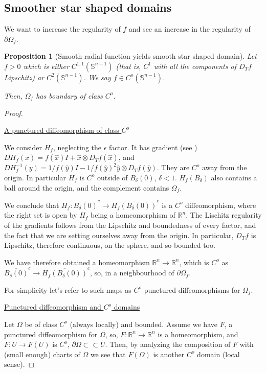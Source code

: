\documentclass[english,a4paper,12pt,oneside]{scrbook}
\theoremstyle{break}
\newtheorem{prop}[equation]{Proposition}
\newenvironment{mproof}[1][\proofname]{%
  \begin{proof}[#1]$ $\par\nobreak\ignorespaces
}{%
  \end{proof}
}
\renewcommand*{\proofname}{Proof}
\theoremstyle{remark}
\newcommand{\mR}{\mathbb{R}}
\newcommand{\mS}{\mathbb{S}^{n-1}}
\newcommand{\cc}{\subset\subset}
\newcommand{\xh}{\hat{x}}
\newcommand{\yh}{\hat{y}}
\newcommand{\eps}{\epsilon}
\begin{document}
\subsection{Smoother star shaped domains}

We want to increase the regularity of $f$ and see an increase in the regularity of $\partial \Omega_f$.

\begin{prop}[Smooth radial function yields smooth star shaped domain]
Let $f>0$ which is either $C^{1,1}(\mS)$ (that is, $C^1$ with all the components of $D_T f$ Lipschitz) ar $C^2(\mS)$. We say $f \in C^o(\mS)$. 

Then, $\Omega_f$ has boundary of class $C^o$.

\end{prop}

\begin{mproof}

\underline{A punctured diffeomorphism of class $C^o$}

We consider $H_f$, neglecting the $\eps$ factor. It has gradient (see \cite{deckelnick}) $D H_f(x) = f(\xh)I+\xh \otimes D_Tf(\xh)$, and  $D H_f^{-1}(y) =1/f(\yh)I-1/f(\yh)^2 \yh \otimes D_Tf(\yh)$. They are $C^o$ away from the origin. In particular $H_f$ is $C^o$  outside of $B_\delta(0)$, $\delta < 1$. $H_f(B_\delta)$ also contains a ball around the origin, and the complement contains $\Omega_f$.

We conclude that $H_f: \overline{B_\delta(0)}^c \rightarrow \overline{H_f(B_\delta(0))}^c$ is a $C^o$ diffeomorphism, where the right set is open by $H_f$ being a homeomorphism of $\mR^n$. The Lischitz regularity of the gradients follows from the Lipschitz and boundedness of every factor, and the fact that we are setting ourselves away from the origin. In particular, $D_T f$ is Lipschitz, therefore continuous, on the sphere, and so bounded too.

We have therefore obtained a homeomorphism $\mR^n \rightarrow \mR^n$, which is $C^o$ as $\overline{B_\delta(0)}^c \rightarrow \overline{H_f(B_\delta(0))}^c$, so, in a neighbourhood of $\partial \Omega_f$.

For simplicity let's refer to such maps as $C^o$ punctured diffeomorphisms for $\Omega_f$.

\underline{Punctured diffeomorphism and $C^o$ domains}

Let $\Omega$ be of class $C^o$ (always locally) and bounded. Assume we have $F$, a punctured diffeomorphism for $\Omega$, so, $F:\mR^n\rightarrow \mR^n$ is a homeomorphism, and $F: U\rightarrow F(U)$ is $C^o$, $\partial \Omega \cc U$. Then, by analyzing the composition of $F$ with (small enough) charts of $\Omega$ we see that $F(\Omega)$ is another $C^o$ domain (local sense). 


\end{mproof}
\end{document}
